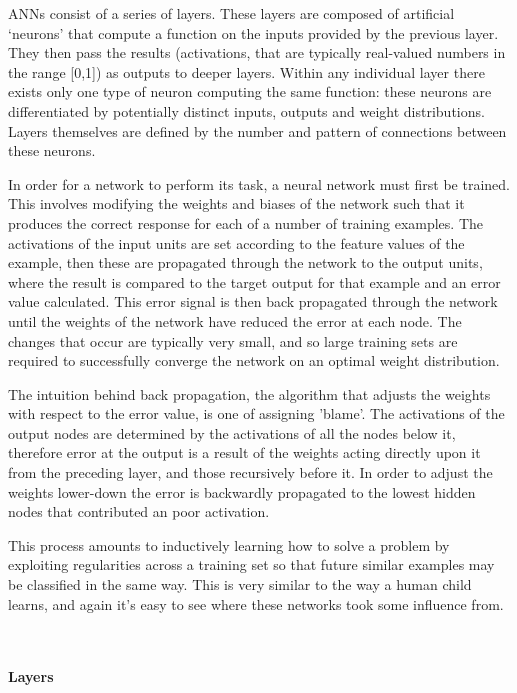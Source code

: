 \documentclass[a4paper,11pt,titlepage]{article}
\begin{document}
		ANNs consist of a series of layers. These layers are composed of artificial `neurons' that compute a function on the inputs provided by the previous layer. They then pass the results (activations, that are typically real-valued numbers in the range [0,1]) as outputs to deeper layers. Within any individual layer there exists only one type of neuron computing the same function: these neurons are differentiated by potentially distinct inputs, outputs and weight distributions. Layers themselves are defined by the number and pattern of connections between these neurons. 
		\par 
		In order for a network to perform its task, a neural network must first be trained. This involves modifying the weights and biases of the network such that it produces the correct response for each of a number of training examples. The activations of the input units are set according to the feature values of the example, then these are propagated through the network to the output units, where the result is compared to the target output for that example and an error value calculated. This error signal is then back propagated through the network until the weights of the network have reduced the error at each node. The changes that occur are typically very small, and so large training sets are required to successfully converge the network on an optimal weight distribution. 		
		\par 
		The intuition behind back propagation, the algorithm that adjusts the weights with respect to the error value, is one of assigning 'blame'. The activations of the output nodes are determined by the activations of all the nodes below it, therefore error at the output is a result of the weights acting directly upon it from the preceding layer, and those recursively before it. In order to adjust the weights lower-down the error is backwardly propagated to the lowest hidden nodes that contributed an poor activation.			\par
		This process amounts to inductively learning how to solve a problem by exploiting regularities across a training set so that future similar examples may be classified in the same way. This is very similar to the way a human child learns, and again it's easy to see where these networks took some influence from.
\\\
\\\

\textbf{Layers}
\end{document}
